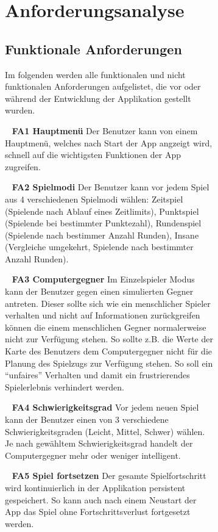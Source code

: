 \documentclass{scrartcl}
\begin{document}
\begin{figure}[!ht]
\begin{figure}[!ht]
\textbf{}

\section{Anforderungsanalyse}
\subsection{Funktionale Anforderungen}

Im folgenden werden alle funktionalen und nicht funktionalen Anforderungen
aufgelistet, die vor oder während der Entwicklung der Applikation gestellt wurden.

\ \newline
\textbf{FA1 Hauptmenü} \newline
Der Benutzer kann von einem Hauptmenü, welches nach Start der App angzeigt wird,
schnell auf die wichtigsten Funktionen der App zugreifen.

\ \newline
\textbf{FA2 Spielmodi} \newline
Der Benutzer kann vor jedem Spiel aus 4 verschiedenen Spielmodi wählen: Zeitspiel
(Spielende nach Ablauf eines Zeitlimits), Punktspiel (Spielende bei bestimmter
Punktezahl), Rundenspiel (Spielende nach bestimmer Anzahl Runden), Insane
(Vergleiche umgekehrt, Spielende nach bestimmter Anzahl Runden).

\ \newline
\textbf{FA3 Computergegner} \newline
Im Einzelspieler Modus kann der Benutzer gegen einen simulierten Gegner antreten.
Dieser sollte sich wie ein menschlicher Spieler verhalten und nicht auf
Informationen zurückgreifen können die einem menschlichen Gegner normalerweise
nicht zur Verfügung stehen. So sollte z.B. die Werte der Karte des Benutzers dem
Computergegner nicht für die Planung des Spielzugs zur Verfügung stehen. So soll
ein \enquote{unfaires} Verhalten und damit ein frustrierendes Spielerlebnis
verhindert werden.

\ \newline
\textbf{FA4 Schwierigkeitsgrad} \newline
Vor jedem neuen Spiel kann der Benutzer einen von 3 verschiedene
Schwierigkeitsgraden (Leicht, Mittel, Schwer) wählen. Je nach gewähltem
Schwierigkeitsgrad handelt der Computergegner mehr oder weniger intelligent.

\ \newline
\textbf{FA5 Spiel fortsetzen} \newline
Der gesamte Spielfortschritt wird kontinuierlich in der Applikation persistent
gespeichert. So kann auch nach einem Neustart der App das Spiel ohne
Fortschrittsverlust fortgesetzt werden.


\end{figure}
\end{figure}
\end{document}
